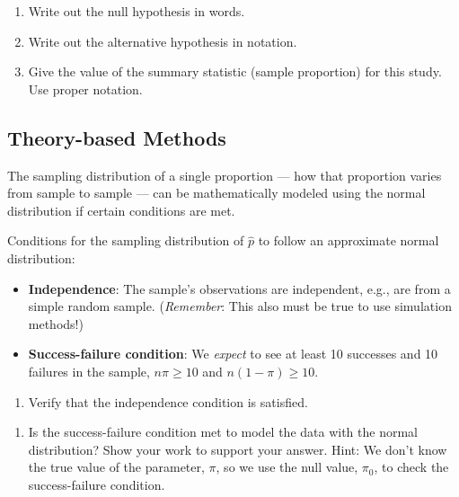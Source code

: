 \documentclass[
]{report}
\providecommand{\tightlist}{%
  \setlength{\itemsep}{0pt}\setlength{\parskip}{0pt}}
\begin{document}
\vspace{0.8in}

\begin{enumerate}
\def\labelenumi{\arabic{enumi}.}
\setcounter{enumi}{1}
\item
  Write out the null hypothesis in words.
  \vspace{0.8in}
\item
  Write out the alternative hypothesis in notation.
  \vspace{0.3in}
\item
  Give the value of the summary statistic (sample proportion) for this study. Use proper notation.
\end{enumerate}

\vspace{0.3in}

\hypertarget{theory-based-methods}{%
\subsection*{Theory-based Methods}\label{theory-based-methods}}

The sampling distribution of a single proportion --- how that proportion varies from sample to sample --- can be mathematically modeled using the normal distribution if certain conditions are met.

Conditions for the sampling distribution of \(\hat{p}\) to follow an approximate normal distribution:

\begin{itemize}
\item
  \textbf{Independence}: The sample's observations are independent, e.g., are from a simple random sample. (\emph{Remember}: This also must be true to use simulation methods!)
\item
  \textbf{Success-failure condition}: We \emph{expect} to see at least 10 successes and 10 failures in the sample, \(n\pi≥10\) and \(n(1-\pi)≥10\).
\end{itemize}

\begin{enumerate}
\def\labelenumi{\arabic{enumi}.}
\setcounter{enumi}{4}
\tightlist
\item
  Verify that the independence condition is satisfied.
\end{enumerate}

\vspace{0.5in}

\begin{enumerate}
\def\labelenumi{\arabic{enumi}.}
\setcounter{enumi}{5}
\tightlist
\item
  Is the success-failure condition met to model the data with the normal distribution? Show your work to support your answer. Hint: We don't know the true value of the parameter, \(\pi\), so we use the null value, \(\pi_0\), to check the success-failure condition.
\end{enumerate}
\end{document}
